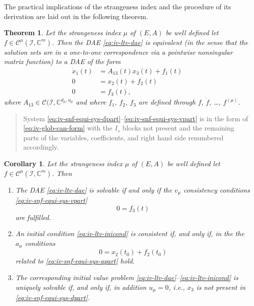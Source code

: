 \documentclass[]{book}
\newenvironment {JHSAYS} [0] {\begin{quote}\color{jhsc}} {\end{quote}}
\newtheorem{theorem}{Theorem}[chapter]
\newtheorem{corollary}{Corollary}[chapter]
\theoremstyle{definition}
\theoremstyle{definition}
\theoremstyle{definition}
\theoremstyle{definition}
\theoremstyle{remark}
\begin{document}
The practical implications of the strangeness index and the procedure of its derivation are laid out in the following theorem.

\begin{theorem}
\protect\hypertarget{thm:iv-strangeness-free-equiv-system}{}{\label{thm:iv-strangeness-free-equiv-system} }Let the strangeness index \(\mu\) of \((E, A)\) be well defined let \(f\in \mathcal C^\mu(\mathcal I, \mathbb C^{m})\). Then the DAE \eqref{eq:iv-ltv-dae} is equivalent (in the sense that the solution sets are in a one-to-one correspondence via a pointwise nonsingular matrix function) to a DAE of the form
\begin{align}
\dot x_1(t) &= A_{13}(t)x_3(t) + f_1(t) \label{eq:iv-snf-equi-sys-dpart}\\
0 &= x_2(t) + f_2(t) \label{eq:iv-snf-equi-sys-apart}\\
0 &= f_3(t), \label{eq:iv-snf-equi-sys-vpart}
\end{align}
where \(A_{13} \in \mathcal C(\mathcal I, \mathbb C^{d_\mu, u_\mu}\) and where \(f_1\), \(f_2\), \(f_3\) are defined through \(f\), \(\dot f\), \dots, \(f^{(\mu)}\).
\end{theorem}

\begin{JHSAYS}
System \eqref{eq:iv-snf-equi-sys-dpart}--\eqref{eq:iv-snf-equi-sys-vpart} is in the form of \eqref{eq:iv-glob-can-form} with the \(I_s\) blocks not present and the remaining parts of the variables, coefficients, and right hand side renumbered accordingly.
\end{JHSAYS}

\begin{corollary}
\protect\hypertarget{cor:iv-snf-solvability}{}{\label{cor:iv-snf-solvability} }Let the strangeness index \(\mu\) of \((E, A)\) be well defined let \(f\in \mathcal C^\mu(\mathcal I, \mathbb C^{m})\). Then

\begin{enumerate}
\def\labelenumi{\arabic{enumi}.}
\item
  The DAE \eqref{eq:iv-ltv-dae} is solvable if and only if the \(v_\mu\) consistency conditions \eqref{eq:iv-snf-equi-sys-vpart}
  \[
    0=f_3(t)
  \]
  are fulfilled.
\item
  An initial condition \eqref{eq:iv-ltv-inicond} is consistent if, and only if, in the the \(a_\mu\) conditions
  \[
  0=x_2(t_0) + f_2(t_0)
  \]
  related to \eqref{eq:iv-snf-equi-sys-apart} hold.
\item
  The corresponding initial value problem \eqref{eq:iv-ltv-dae}--\eqref{eq:iv-ltv-inicond} is uniquely solvable if, and only if, in addition \(u_\mu=0\), i.e., \(x_3\) is not present in \eqref{eq:iv-snf-equi-sys-dpart}.
\end{enumerate}
\end{corollary}
\end{document}
